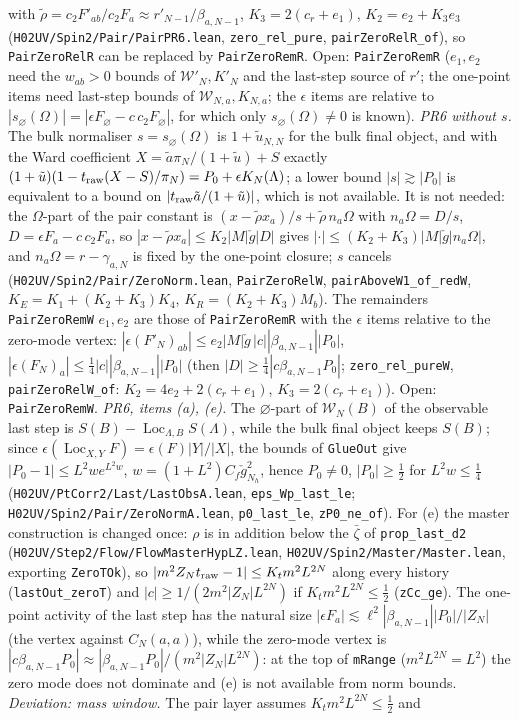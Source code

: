 \documentclass[11pt]{amsart}
\theoremstyle{definition}
\theoremstyle{remark}
\numberwithin{equation}{section}
\begin{document}
with $\tilde\rho=c_2F'_{ab}/c_2F_a\approx r'_{N-1}/\beta_{a,N-1}$, $K_3=2(c_r+e_1)$, $K_2=e_2+K_3e_3$ (\texttt{H02UV/Spin2/Pair/PairPR6.lean}, \texttt{zero\_rel\_pure}, \texttt{pairZeroRelR\_of}), so \texttt{PairZeroRelR} can be replaced by \texttt{PairZeroRemR}. Open: \texttt{PairZeroRemR} ($e_1,e_2$ need the $w_{ab}>0$ bounds of $\mathcal W'_N,K'_N$ and the last-step source of $r'$; the one-point items need last-step bounds of $\mathcal W_{N,a},K_{N,a}$; the $\epsilon$ items are relative to $|s_\varnothing(\Omega)|=|\epsilon F_\varnothing-c\,c_2F_\varnothing|$, for which only $s_\varnothing(\Omega)\ne0$ is known). \emph{PR6 without $s$.} The bulk normaliser $s=s_\varnothing(\Omega)$ is $1+\tilde u_{N,N}$ for the bulk final object, and with the Ward coefficient $X=\tilde a\pi_N/(1+\tilde u)+S$ exactly $(1+\tilde u)(1-t_{\rm raw}(X-S)/\pi_N)=P_0+\epsilon K_N(\Lambda)$; a lower bound $|s|\gtrsim|P_0|$ is equivalent to a bound on $|t_{\rm raw}\tilde a/(1+\tilde u)|$, which is not available. It is not needed: the $\Omega$-part of the pair constant is $(x-\tilde\rho x_a)/s+\tilde\rho\,n_a\Omega$ with $n_a\Omega=D/s$, $D=\epsilon F_a-c\,c_2F_a$, so $|x-\tilde\rho x_a|\le K_2|M|\check g|D|$ gives $|\cdot|\le(K_2+K_3)|M|\check g|n_a\Omega|$, and $n_a\Omega=r-\gamma_{a,N}$ is fixed by the one-point closure; $s$ cancels (\texttt{H02UV/Spin2/Pair/ZeroNorm.lean}, \texttt{PairZeroRelW}, \texttt{pairAboveW1\_of\_redW}, $K_E=K_1+(K_2+K_3)K_4$, $K_R=(K_2+K_3)M_b$). The remainders \texttt{PairZeroRemW} $e_1,e_2$ are those of \texttt{PairZeroRemR} with the $\epsilon$ items relative to the zero-mode vertex: $|\epsilon(F'_N)_{ab}|\le e_2|M|\check g\,|c||\beta_{a,N-1}||P_0|$, $|\epsilon(F_N)_a|\le\frac14|c||\beta_{a,N-1}||P_0|$ (then $|D|\ge\frac14|c\beta_{a,N-1}P_0|$; \texttt{zero\_rel\_pureW}, \texttt{pairZeroRelW\_of}: $K_2=4e_2+2(c_r+e_1)$, $K_3=2(c_r+e_1)$). Open: \texttt{PairZeroRemW}. \emph{PR6, items (a), (e).} The $\varnothing$-part of $\mathcal W_N(B)$ of the observable last step is $S(B)-\operatorname{Loc}_{\Lambda,B}S(\Lambda)$, while the bulk final object keeps $S(B)$; since $\epsilon(\operatorname{Loc}_{X,Y}F)=\epsilon(F)|Y|/|X|$, the bounds of \texttt{GlueOut} give $|P_0-1|\le L^2we^{L^2w}$, $w=(1+L^2)C_f\check g_{N_h}^2$, hence $P_0\neq0$, $|P_0|\ge\frac12$ for $L^2w\le\frac14$ (\texttt{H02UV/PtCorr2/Last/LastObsA.lean}, \texttt{eps\_Wp\_last\_le}; \texttt{H02UV/Spin2/Pair/ZeroNormA.lean}, \texttt{p0\_last\_le}, \texttt{zP0\_ne\_of}). For (e) the master construction is changed once: $\rho$ is in addition below the $\bar\zeta$ of \texttt{prop\_last\_d2} (\texttt{H02UV/Step2/Flow/FlowMasterHypLZ.lean}, \texttt{H02UV/Spin2/Master/Master.lean}, exporting \texttt{ZeroTOk}), so $|m^2Z_Nt_{\rm raw}-1|\le K_tm^2L^{2N}$ along every history (\texttt{lastOut\_zeroT}) and $|c|\ge1/(2m^2|Z_N|L^{2N})$ if $K_tm^2L^{2N}\le\frac12$ (\texttt{zCc\_ge}). The one-point activity of the last step has the natural size $|\epsilon F_a|\lesssim\ell^2|\beta_{a,N-1}||P_0|/|Z_N|$ (the vertex against $C_N(a,a)$), while the zero-mode vertex is $|c\beta_{a,N-1}P_0|\approx|\beta_{a,N-1}P_0|/(m^2|Z_N|L^{2N})$: at the top of \texttt{mRange} ($m^2L^{2N}=L^2$) the zero mode does not dominate and (e) is not available from norm bounds. \emph{Deviation: mass window.} The pair layer assumes $K_tm^2L^{2N}\le\frac12$ and 
\end{document}
